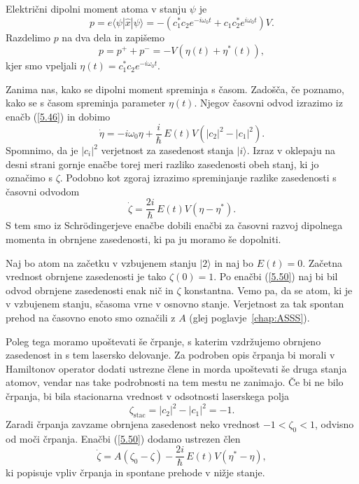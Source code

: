 Električni dipolni moment atoma v stanju ${\psi}$ je 
\begin{equation}  
\label{5.47}
p=e\langle\psi|\hat{x}|\psi\rangle=-
(c_1^{\ast}c_2e^{-i \omega_0t}+c_1c_2^{\ast}e^{i \omega_0 t}) V.
\end{equation}
Razdelimo $p$ na dva dela in zapišemo
\begin{equation}  
\label{5.48}
p=p^+ + p^-=-V\left(\eta(t)+\eta^{\ast}(t)\right),
\end{equation}
kjer smo vpeljali $\eta(t)=c_1^{\ast}c_2e^{-i \omega_0 t}$.

Zanima nas, kako se dipolni moment spreminja s časom. Zadošča, če poznamo, kako se 
s časom spreminja parameter $\eta(t)$. Njegov časovni odvod izrazimo
iz enačb (\ref{5.46}) in dobimo
\begin{equation}  
\label{5.49}
\dot{\eta}=- i \omega_0\eta+\frac{i}{\hbar}\,E(t)V\left(|c_2|^2-|c_1|^2\right).
\end{equation}
Spomnimo, da je $|c_i|^2$ verjetnost za zasedenost stanja $|i\rangle$. Izraz v oklepaju
na desni strani gornje enačbe torej meri razliko zasedenosti obeh stanj, ki jo označimo
s $\zeta$. Podobno kot zgoraj izrazimo spreminjanje razlike zasedenosti s časovni odvodom 
\begin{equation}  
\label{5.50}
\dot{\zeta}=\frac{2i}{\hbar}\, E(t)V\left(\eta- \eta^{\ast}\right).
\end{equation}
S tem smo iz Schr\"odingerjeve enačbe dobili enačbi za časovni razvoj
dipolnega momenta in obrnjene zasedenosti, ki pa ju moramo še dopolniti.

Naj bo atom na začetku v vzbujenem stanju $|2\rangle$ in naj bo $E(t)=0$. Začetna
vrednost obrnjene zasedenosti je tako $\zeta(0)=1$. Po enačbi (\ref{5.50}) naj bi 
bil odvod obrnjene zasedenosti enak nič in $\zeta$ konstantna. 
Vemo pa, da se atom, ki je v vzbujenem stanju, sčasoma vrne v
osnovno stanje. Verjetnost za tak spontan prehod na časovno enoto smo označili z $A$ (glej 
poglavje~\ref{chap:ASSS}).

Poleg tega moramo upoštevati še črpanje, s katerim
vzdržujemo obrnjeno zasedenost in s tem lasersko delovanje. Za podroben
opis črpanja bi morali v Hamiltonov operator dodati ustrezne člene in
morda upoštevati še druga stanja atomov, vendar nas take podrobnosti na
tem mestu ne zanimajo. Če bi ne bilo črpanja, bi bila stacionarna vrednost
v odsotnosti laserskega polja
\begin{equation}
 \zeta_{\mathrm{stac}}= |c_2|^2-|c_1|^2 = -1.
\end{equation}
Zaradi črpanja zavzame obrnjena zasedenost neko vrednost $-1<\zeta_0<1$, 
odvisno od moči črpanja. Enačbi (\ref{5.50}) dodamo ustrezen člen
\begin{equation}  
\label{5.51}
\dot{\zeta}=A\left(\zeta_0-\zeta\right)- \frac{2i}{\hbar}\,E(t)V\left(\eta^{\ast}-\eta\right),
\end{equation}
ki popisuje vpliv črpanja in spontane prehode v nižje stanje. 

